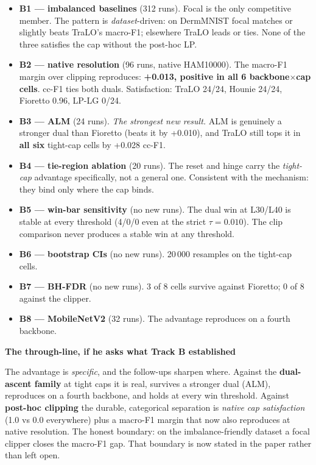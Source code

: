 \documentclass[11pt,a4paper]{article}
\newenvironment{callout}[1]
  {\par\medskip\noindent\begin{lrbox}{\calloutbox}%
   \begin{minipage}{\dimexpr\linewidth-20pt\relax}%
   \textbf{#1}\par\smallskip}
  {\end{minipage}\end{lrbox}%
   \setlength{\fboxsep}{10pt}%
   \colorbox{boxgrey}{\usebox{\calloutbox}}\par\medskip}
\begin{document}
\begin{itemize}
\item \textbf{B1 --- imbalanced baselines} (312 runs). Focal is the only competitive
member. The pattern is \emph{dataset}-driven: on DermMNIST focal matches or slightly beats
TraLO's macro-F1; elsewhere TraLO leads or ties. None of the three satisfies the cap
without the post-hoc LP.
\item \textbf{B2 --- native resolution} (96 runs, native HAM10000). The macro-F1 margin
over clipping reproduces: \textbf{+0.013, positive in all 6 backbone$\times$cap cells}.
cc-F1 ties both duals. Satisfaction: TraLO 24/24, Hounie 24/24, Fioretto 0.96, LP-LG 0/24.
\item \textbf{B3 --- ALM} (24 runs). \emph{The strongest new result.} ALM is genuinely a
stronger dual than Fioretto (beats it by +0.010), and TraLO still tops it in
\textbf{all six} tight-cap cells by +0.028 cc-F1.
\item \textbf{B4 --- tie-region ablation} (20 runs). The reset and hinge carry the
\emph{tight-cap} advantage specifically, not a general one. Consistent with the mechanism:
they bind only where the cap binds.
\item \textbf{B5 --- win-bar sensitivity} (no new runs). The dual win at L30/L40 is stable
at every threshold (4/0/0 even at the strict $\tau{=}0.010$). The clip comparison never
produces a stable win at any threshold.
\item \textbf{B6 --- bootstrap CIs} (no new runs). 20\,000 resamples on the tight-cap
cells.
\item \textbf{B7 --- BH-FDR} (no new runs). 3 of 8 cells survive against Fioretto; 0 of 8
against the clipper.
\item \textbf{B8 --- MobileNetV2} (32 runs). The advantage reproduces on a fourth
backbone.
\end{itemize}

\begin{callout}{The through-line, if he asks what Track B established}
The advantage is \emph{specific}, and the follow-ups sharpen where. Against the
\textbf{dual-ascent family} at tight caps it is real, survives a stronger dual (ALM),
reproduces on a fourth backbone, and holds at every win threshold. Against
\textbf{post-hoc clipping} the durable, categorical separation is \emph{native cap
satisfaction} (1.0 vs 0.0 everywhere) plus a macro-F1 margin that now also reproduces at
native resolution. The honest boundary: on the imbalance-friendly dataset a focal clipper
closes the macro-F1 gap. That boundary is now stated in the paper rather than left open.
\end{callout}
\end{document}
